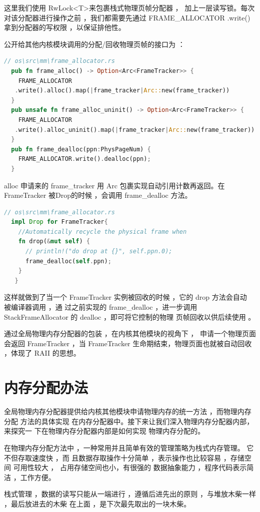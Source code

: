 	这里我们使用  RwLock\textless T\textgreater 来包裹栈式物理页帧分配器 ，
	加上一层读写锁。每次对该分配器进行操作之前 ，我们都需要先通过  FRAME\_ALLOCATOR .write() 拿到分配器的写权限 ，以保证排他性。
	
	公开给其他内核模块调用的分配/回收物理页帧的接口为 ：
\begin{lstlisting}[language=Rust]
  // os\src\mm\frame_allocator.rs
  pub fn frame_alloc() -> Option<Arc<FrameTracker>> {
    FRAME_ALLOCATOR
   .write().alloc().map(|frame_tracker|Arc::new(frame_tracker))
  }
  pub unsafe fn frame_alloc_uninit() -> Option<Arc<FrameTracker>> {
    FRAME_ALLOCATOR
   .write().alloc_uninit().map(|frame_tracker|Arc::new(frame_tracker))
  }
  pub fn frame_dealloc(ppn:PhysPageNum) {
    FRAME_ALLOCATOR.write().dealloc(ppn);
  }
\end{lstlisting}

	alloc 申请来的 frame\_tracker 用 Arc 包裹实现自动引用计数再返回。在 FrameTracker 被Drop的时候 ，会调用 frame\_dealloc 方法。
\begin{lstlisting}[language=Rust]
  // os\src\mm\frame_allocator.rs
  impl Drop for FrameTracker{
    //Automatically recycle the physical frame when
    fn drop(&mut self) {
      // println!("do drop at {}", self.ppn.0);
      frame_dealloc(self.ppn);
    }
   }
\end{lstlisting}

	这样就做到了当一个  FrameTracker 实例被回收的时候 ，它的  drop 方法会自动
	被编译器调用 ，通 过之前实现的  frame\_dealloc ，进一步调用 StackFrameAllocator 的 dealloc ，即可将它控制的物理 页帧回收以供后续使用
	。
	
	通过全局物理内存分配器的包装 ，在内核其他模块的视角下 ，  申请一个物理页面
	会返回 FrameTracker ，当 FrameTracker 生命期结束，物理页面也就被自动回收
	 ，体现了 RAII 的思想。
	\section{内存分配办法}
	全局物理内存分配器提供给内核其他模块申请物理内存的统一方法 ，而物理内存分配
	方法的具体实现 在内存分配器中。接下来让我们深入物理内存分配器内部，来探究一
	下在物理内存分配器内部是如何实现 物理内存分配的。
	
	在物理内存分配方法中 ，一种常用并且简单有效的管理策略为栈式内存管理。  它
	不但存取速度快 ，而 且数据存取操作十分简单 ，表示操作也比较容易 ，存储空间
	可用性较大 ，  占用存储空间也小，有很强的 数据抽象能力 ，程序代码表示简洁
	，工作方便。
	
	栈式管理 ，数据的读写只能从一端进行 ，遵循后进先出的原则 ，与堆放木柴一样 ，最后放进去的木柴 在上面 ，是下次最先取出的一块木柴。
	
